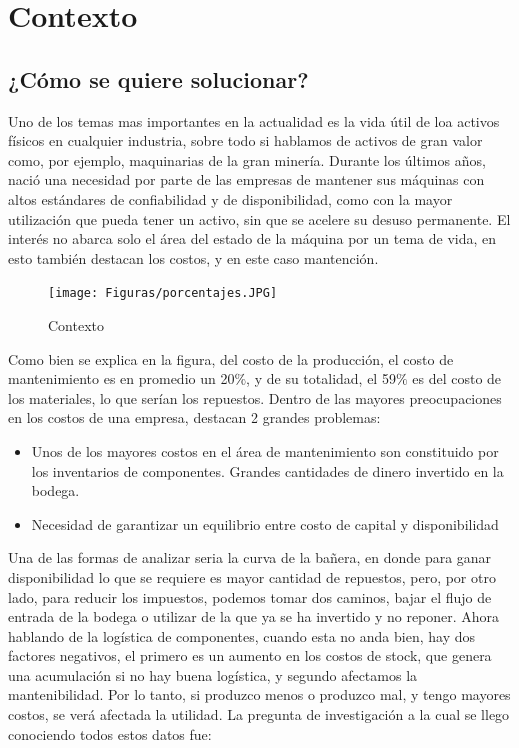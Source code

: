 \documentclass[]{article}
\begin{document}
\hypertarget{Contexto}{
\section{Contexto }
\label{Contexto}}

\subsection{¿Cómo se quiere solucionar?}
Uno de los temas mas importantes en la actualidad es la vida útil de loa activos físicos en cualquier industria, sobre todo si hablamos de activos de gran valor como, por ejemplo, maquinarias de la gran minería.
Durante los últimos años, nació una necesidad por parte de las empresas de mantener sus máquinas con altos estándares de confiabilidad y de disponibilidad, como con la mayor utilización que pueda tener un activo, sin que se acelere su desuso permanente. 
El interés no abarca solo el área del estado de la máquina por un tema de vida, en esto también destacan los costos, y en este caso mantención.

\begin{figure}[!h]
    \centering
    \texttt{[image: Figuras/porcentajes.JPG]}
    \caption{Contexto}
    \label{fig:my_label}
\end{figure}
Como bien se explica en la figura, del costo de la producción, el costo de mantenimiento es en promedio un 20$\%$, y de su totalidad, el 59$\%$ es del costo de los materiales, lo que serían los repuestos. 
Dentro de las mayores preocupaciones en los costos de una empresa, destacan 2 grandes problemas:

\begin{itemize}
    \item 	Unos de los mayores costos en el área de mantenimiento son constituido por los inventarios de componentes.
Grandes cantidades de dinero invertido en la bodega.
    \item 	Necesidad de garantizar un equilibrio entre costo de capital y disponibilidad
\end{itemize}

Una de las formas de analizar seria la curva de la bañera, en donde para ganar disponibilidad lo que se requiere es mayor cantidad de repuestos, pero, por otro lado, para reducir los impuestos, podemos tomar dos caminos, bajar el flujo de entrada de la bodega o utilizar de la que ya se ha invertido y no reponer. 
Ahora hablando de la logística de componentes, cuando esta no anda bien, hay dos factores negativos, el primero es un aumento en los costos de stock, que genera una acumulación si no hay buena logística, y segundo afectamos la mantenibilidad. Por lo tanto, si produzco menos o produzco mal, y tengo mayores costos, se verá afectada la utilidad.
La pregunta de investigación a la cual se llego conociendo todos estos datos fue: 
\end{document}
